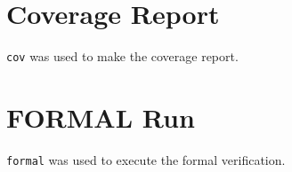 

\section{Coverage Report}

\texttt{cov} was used to make the coverage report.



\section*{FORMAL Run}

\texttt{formal} was used to execute the formal verification.


